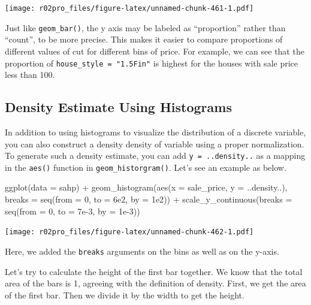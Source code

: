 \documentclass[
]{book}
\newenvironment{Shaded}{\begin{snugshade}}{\end{snugshade}}
\newcommand{\AttributeTok}[1]{\textcolor[rgb]{0.77,0.63,0.00}{#1}}
\newcommand{\DecValTok}[1]{\textcolor[rgb]{0.00,0.00,0.81}{#1}}
\newcommand{\FloatTok}[1]{\textcolor[rgb]{0.00,0.00,0.81}{#1}}
\newcommand{\FunctionTok}[1]{\textcolor[rgb]{0.00,0.00,0.00}{#1}}
\newcommand{\NormalTok}[1]{#1}
\newcommand{\SpecialCharTok}[1]{\textcolor[rgb]{0.00,0.00,0.00}{#1}}
\begin{document}
\texttt{[image: r02pro\_files/figure-latex/unnamed-chunk-461-1.pdf]}

Just like \texttt{geom\_bar()}, the y axis may be labeled as ``proportion'' rather than ``count'', to be more precise. This makes it easier to compare proportions of different values of cut for different bins of price. For example, we can see that the proportion of \texttt{house\_style\ =\ "1.5Fin"} is highest for the houses with sale price less than 100.

\hypertarget{density-estimate-using-histograms}{%
\subsection{Density Estimate Using Histograms}\label{density-estimate-using-histograms}}

In addition to using histograms to visualize the distribution of a discrete variable, you can also construct a density density of variable using a proper normalization. To generate such a density estimate, you can add \texttt{y\ =\ ..density..} as a mapping in the \texttt{aes()} function in \texttt{geom\_historgram()}. Let's see an example as below.

\begin{Shaded}
\begin{Highlighting}[]
\FunctionTok{ggplot}\NormalTok{(}\AttributeTok{data =}\NormalTok{ sahp) }\SpecialCharTok{+}  \FunctionTok{geom\_histogram}\NormalTok{(}\FunctionTok{aes}\NormalTok{(}\AttributeTok{x =}\NormalTok{ sale\_price, }\AttributeTok{y =}\NormalTok{ ..density..), }\AttributeTok{breaks =} \FunctionTok{seq}\NormalTok{(}\AttributeTok{from =} \DecValTok{0}\NormalTok{, }\AttributeTok{to =} \FloatTok{6e2}\NormalTok{, }\AttributeTok{by =} \FloatTok{1e2}\NormalTok{)) }\SpecialCharTok{+} \FunctionTok{scale\_y\_continuous}\NormalTok{(}\AttributeTok{breaks =} \FunctionTok{seq}\NormalTok{(}\AttributeTok{from =} \DecValTok{0}\NormalTok{, }\AttributeTok{to =} \FloatTok{7e{-}3}\NormalTok{, }\AttributeTok{by =} \FloatTok{1e{-}3}\NormalTok{))}
\end{Highlighting}
\end{Shaded}

\texttt{[image: r02pro\_files/figure-latex/unnamed-chunk-462-1.pdf]}

Here, we added the \texttt{breaks} arguments on the bins as well as on the y-axis.

Let's try to calculate the height of the first bar together. We know that the total area of the bars is 1, agreeing with the definition of density. First, we get the area of the first bar. Then we divide it by the width to get the height.
\end{document}
